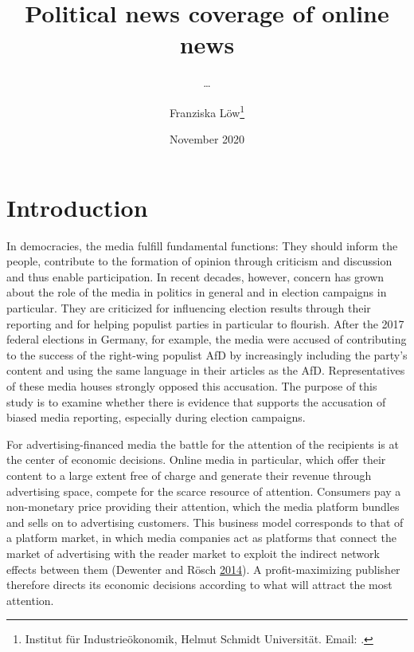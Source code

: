 \documentclass[
]{article}
\title{Political news coverage of online news}
\subtitle{\ldots{}}
\author{Franziska Löw\footnote{Institut für Industrieökonomik, Helmut Schmidt
  Universität. Email: .}}
\date{November 2020}
\begin{document}
\maketitle

\hypertarget{introduction}{%
\section{Introduction}\label{introduction}}

In democracies, the media fulfill fundamental functions: They should
inform the people, contribute to the formation of opinion through
criticism and discussion and thus enable participation. In recent
decades, however, concern has grown about the role of the media in
politics in general and in election campaigns in particular. They are
criticized for influencing election results through their reporting and
for helping populist parties in particular to flourish. After the 2017
federal elections in Germany, for example, the media were accused of
contributing to the success of the right-wing populist AfD by
increasingly including the party's content and using the same language
in their articles as the AfD. Representatives of these media houses
strongly opposed this accusation. The purpose of this study is to
examine whether there is evidence that supports the accusation of biased
media reporting, especially during election campaigns.

For advertising-financed media the battle for the attention of the
recipients is at the center of economic decisions. Online media in
particular, which offer their content to a large extent free of charge
and generate their revenue through advertising space, compete for the
scarce resource of attention. Consumers pay a non-monetary price
providing their attention, which the media platform bundles and sells on
to advertising customers. This business model corresponds to that of a
platform market, in which media companies act as platforms that connect
the market of advertising with the reader market to exploit the indirect
network effects between them (Dewenter and Rösch
\protect\hyperlink{ref-dewenter_einfuhrung_2014}{2014}). A
profit-maximizing publisher therefore directs its economic decisions
according to what will attract the most attention.
\end{document}
